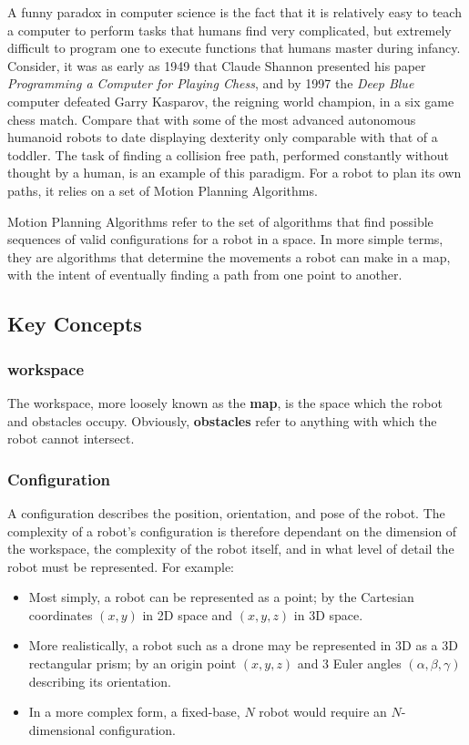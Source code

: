 
A funny paradox in computer science is the fact that it is relatively easy to teach a computer to perform tasks that humans find very complicated, but extremely difficult to program one to execute functions that humans master during infancy. Consider, it was as early as 1949 that Claude Shannon presented his paper \textit{Programming a Computer for Playing Chess}\cite{Shannon1950}, and by 1997 the \textit{Deep Blue} computer defeated Garry Kasparov, the reigning world champion, in a six game chess match.\cite{Campbell2002} Compare that with some of the most advanced autonomous humanoid robots to date displaying dexterity only comparable with that of a toddler. The task of finding a collision free path, performed constantly without thought by a human, is an example of this paradigm. For a robot to plan its own paths, it relies on a set of Motion Planning Algorithms.

Motion Planning Algorithms refer to the set of algorithms that find possible sequences of valid \gls{configuration}s for a robot in a space. In more simple terms, they are algorithms that determine the movements a robot can make in a map, with the intent of eventually finding a path from one point to another.

\subsection{Key Concepts}
    \subsubsection{\Gls{workspace}}
    The \gls{workspace}, more loosely known as the \textbf{map}, is the space which the robot and obstacles occupy. Obviously, \textbf{obstacles} refer to anything with which the robot cannot intersect.
    
    \subsubsection{Configuration}
    A configuration describes the position, orientation, and pose of the robot. The complexity of a robot's configuration is therefore dependant on the dimension of the \gls{workspace}, the complexity of the robot itself, and in what level of detail the robot must be represented. For example:
    \begin{itemize}
        \item Most simply, a robot can be represented as a point; by the Cartesian coordinates $(x,y)$ in \gls{2D} space and $(x,y,z)$ in \gls{3D} space.
        \item More realistically, a robot such as a drone may be represented in \gls{3D} as a 3D rectangular prism; by an origin point $(x,y,z)$ and 3 Euler angles $(\alpha,\beta,\gamma)$ describing its orientation.
        \item In a more complex form, a fixed-base, $N$  robot would require an $N$-dimensional configuration.
    \end{itemize}

